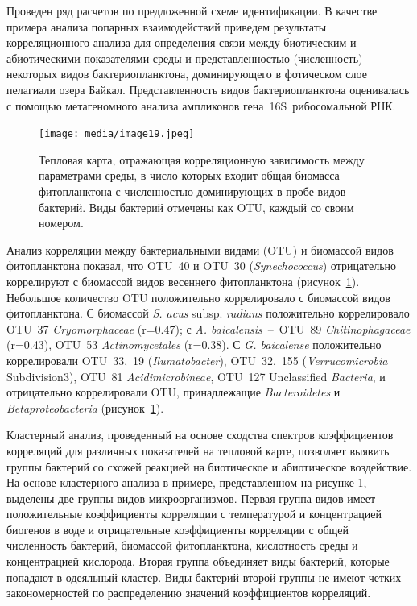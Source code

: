 \documentclass[a4paper,12pt,openany,final]{extreport}
\def\oldcaption{} \let\oldcaption=\caption
\def\caption{\stepcounter{captionsnum}\oldcaption}
\begin{document}
Проведен ряд расчетов по предложенной схеме идентификации. В качестве примера анализа попарных взаимодействий приведем результаты корреляционного анализа для определения связи между биотическим и абиотическими показателями среды и представленностью (численность) некоторых видов бактериопланктона, доминирующего в фотическом слое пелагиали озера Байкал. Представленность видов бактериопланктона оценивалась с помощью метагеномного анализа ампликонов гена~16S~рибосомальной РНК.

\begin{figure}\centering

\texttt{[image: media/image19.jpeg]}
\caption{Тепловая карта, отражающая корреляционную зависимость между параметрами среды, в число которых входит общая биомасса фитопланктона с численностью доминирующих в пробе видов бактерий. Виды бактерий отмечены как OTU, каждый со своим номером.}\label{fig:heatmap-1}
\end{figure}

Анализ корреляции между бактериальными видами (OTU) и биомассой видов фитопланктона показал, что OTU~40 и OTU~30 (\emph{Synechococcus}) отрицательно коррелируют с биомассой видов весеннего фитопланктона (рисунок~\ref{fig:heatmap-1}). Небольшое количество OTU положительно коррелировало с биомассой видов фитопланктона. С биомассой \emph{S. acus} subsp. \emph{radians} положительно коррелировало OTU~37 \emph{Cryomorphaceae} (r=0.47); с \emph{A. baicalensis}~--~OTU~89 \emph{Chitinophagaceae} (r=0.43), OTU~53 \emph{Actinomycetales} (r=0.38). С \emph{G. baicalense} положительно коррелировали OTU~33,~19 (\emph{Ilumatobacter}), OTU~32,~155 (\emph{Verrucomicrobia} Subdivision3), OTU~81 \emph{Acidimicrobineae}, OTU~127 Unclassified \emph{Bacteria}, и отрицательно коррелировали OTU, принадлежащие \emph{Bacteroidetes} и \emph{Betaproteobacteria} (рисунок~\ref{fig:heatmap-1}).

Кластерный анализ, проведенный на основе сходства спектров коэффициентов корреляций для различных показателей на тепловой карте, позволяет выявить группы бактерий со схожей реакцией на биотическое и абиотическое воздействие. На основе кластерного анализа в примере, представленном на рисунке \ref{fig:heatmap-1}, выделены две группы видов микроорганизмов. Первая группа видов имеет положительные коэффициенты корреляции с температурой и концентрацией биогенов в воде и отрицательные коэффициенты корреляции с общей численность бактерий, биомассой фитопланктона, кислотность среды и концентрацией кислорода. Вторая группа объединяет виды бактерий, которые попадают в одеяльный кластер. Виды бактерий второй группы не имеют четких закономерностей по распределению значений коэффициентов корреляций.
\end{document}
